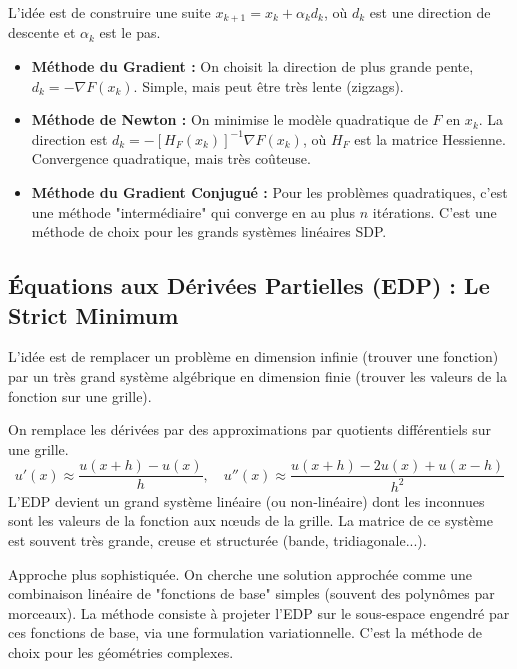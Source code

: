 \begin{definition}
    L'idée est de construire une suite $x_{k+1} = x_k + \alpha_k d_k$, où $d_k$ est une direction de descente et $\alpha_k$ est le pas.
    \begin{itemize}
        \item \textbf{Méthode du Gradient :} On choisit la direction de plus grande pente, $d_k = -\nabla F(x_k)$. Simple, mais peut être très lente (zigzags).
        \item \textbf{Méthode de Newton :} On minimise le modèle quadratique de $F$ en $x_k$. La direction est $d_k = -[H_F(x_k)]^{-1} \nabla F(x_k)$, où $H_F$ est la matrice Hessienne. Convergence quadratique, mais très coûteuse.
        \item \textbf{Méthode du Gradient Conjugué :} Pour les problèmes quadratiques, c'est une méthode "intermédiaire" qui converge en au plus $n$ itérations. C'est une méthode de choix pour les grands systèmes linéaires SDP.
    \end{itemize}
\end{definition}

\subsection{Équations aux Dérivées Partielles (EDP) : Le Strict Minimum}

\begin{remark}
    L'idée est de remplacer un problème en dimension infinie (trouver une fonction) par un très grand système algébrique en dimension finie (trouver les valeurs de la fonction sur une grille).
\end{remark}

\begin{definition}
    On remplace les dérivées par des approximations par quotients différentiels sur une grille.
    $$ u'(x) \approx \frac{u(x+h)-u(x)}{h}, \quad u''(x) \approx \frac{u(x+h)-2u(x)+u(x-h)}{h^2} $$
    L'EDP devient un grand système linéaire (ou non-linéaire) dont les inconnues sont les valeurs de la fonction aux nœuds de la grille. La matrice de ce système est souvent très grande, creuse et structurée (bande, tridiagonale...).
\end{definition}

\begin{definition}
    Approche plus sophistiquée. On cherche une solution approchée comme une combinaison linéaire de "fonctions de base" simples (souvent des polynômes par morceaux). La méthode consiste à projeter l'EDP sur le sous-espace engendré par ces fonctions de base, via une formulation variationnelle. C'est la méthode de choix pour les géométries complexes.
\end{definition}

